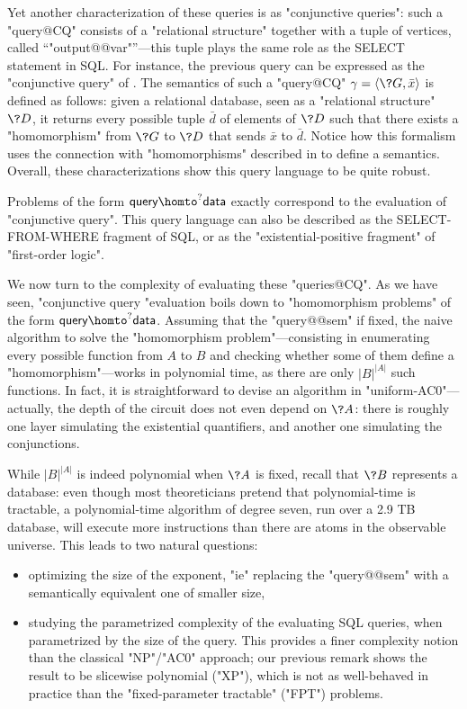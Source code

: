 Yet another characterization of these queries is as "conjunctive queries": such a "query@CQ"
consists of a "relational structure" together with a tuple of vertices, called ``"output@@var"''---this tuple
plays the same role as the \textsf{SELECT} statement in SQL.
For instance, the previous query can be expressed as the "conjunctive query"
of . The semantics of such a "query@CQ"
$\gamma = \tup{\?G, \bar x}$ is defined as follows:
given a relational database, seen as a "relational structure" $\?D$,
it returns every possible tuple $\bar d$ of elements of $\?D$ such that
there exists a "homomorphism" from $\?G$ to $\?D$ that sends $\bar x$ to $\bar d$.
Notice how this formalism uses the connection with "homomorphisms"
described in  to define a semantics.
Overall, these characterizations show this query language to be quite robust.

\begin{known}
	Problems of the form $\textsf{query} \homto^? \textsf{data}$
	exactly correspond to the evaluation of "conjunctive query". This
	query language can also be described as the
	\textsf{SELECT-FROM-WHERE} fragment of SQL, or as the "existential-positive
	fragment" of "first-order logic".
\end{known}

We now turn to the complexity of evaluating these "queries@CQ".
As we have seen, "conjunctive query "evaluation boils down to
"homomorphism problems" of the form $\textsf{query} \homto^? \textsf{data}$.
Assuming that the "query@@sem" if fixed,
the naive algorithm to solve the "homomorphism problem"---consisting in enumerating
every possible function from $A$ to $B$ and checking whether some of them
define a "homomorphism"---works in polynomial time, as there are only $|B|^{|A|}$ such functions.
In fact, it is straightforward to devise an algorithm in "uniform-AC0"---actually, the depth
of the circuit does not even depend on $\?A$: there is roughly one layer simulating the
existential quantifiers, and another one simulating the conjunctions.

While $|B|^{|A|}$ is indeed polynomial when $\?A$ is fixed,
recall that $\?B$ represents a database:
even though most theoreticians pretend that polynomial-time is tractable,
a polynomial-time algorithm of degree seven,
run over a 2.9 TB database, will execute more instructions
than there are atoms in the observable universe.
This leads to two natural questions:
\begin{itemize}
	\item optimizing the size of the exponent, "ie"
		replacing the "query@@sem" with a semantically equivalent one of smaller size,
	\item studying the parametrized complexity of the evaluating SQL queries, when parametrized by
		the size of the query. This provides a finer complexity notion than
		the classical "NP"/"AC0" approach; our previous remark shows the result to be
		slicewise polynomial ("XP"), which is not as well-behaved in practice than
		the "fixed-parameter tractable" ("FPT") problems.
\end{itemize}

